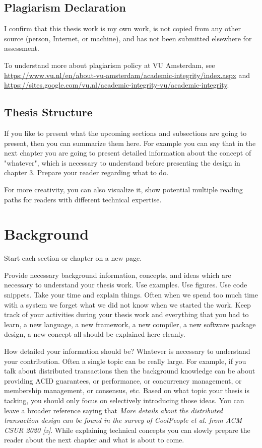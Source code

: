 \documentclass{article}
\begin{document}
\subsection{Plagiarism Declaration}
I confirm that this thesis work is my own work, is not copied from any other source (person, Internet, or machine), and has not been submitted elsewhere for assessment. 

To understand more about plagiarism policy at VU Amsterdam, see \url{https://www.vu.nl/en/about-vu-amsterdam/academic-integrity/index.aspx} and \url{https://sites.google.com/vu.nl/academic-integrity-vu/academic-integrity}. 

\subsection{Thesis Structure}
If you like to present what the upcoming sections and subsections are  going to present, then you can summarize them here. For example you can say that in the next chapter you are going to present detailed  information about the concept of "whatever", which is necessary to understand before presenting the design in chapter 3. Prepare your reader regarding what to do. 

For more creativity, you can also visualize it, show potential multiple reading paths for readers with different technical expertise. 

\newpage 
\section{Background} 
Start each section or chapter on a new page. 

Provide necessary background information, concepts, and ideas which are necessary to understand your thesis work. Use examples. Use figures. Use code snippets. Take your time and explain things. Often when we spend too much time with a system we forget what we did not know when we started the work. Keep track of your activities during your thesis work and everything that you had to learn, a new language, a new framework, a new compiler, a new software package design, a new concept all should be explained here cleanly. 


How detailed your information should be? Whatever is necessary to understand your contribution. Often a single topic can be really large. For example, if you talk about distributed transactions then the background knowledge can be about providing ACID guarantees, or performance, or concurrency management, or membership management, or consensus, etc. Based on what topic your thesis is tacking, you should only focus on selectively introducing those ideas. You can leave a broader reference saying that \textit{More details about the distributed transaction design can be found in the survey of CoolPeople et al. from ACM CSUR 2020 [x]}. While explaining technical concepts you can slowly prepare the reader about the next chapter and what is about to come. 
\end{document}
